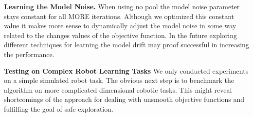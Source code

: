 \textbf{Learning the Model Noise.}
When using no pool the model noise
parameter stays constant for all MORE
iterations. Although we optimized this constant value it makes more sense to
dynamically adjust the model
noise in some way related to the changes values of the objective function.
In the future exploring different techniques for learning the model drift
may proof successful in increasing the performance.

\textbf{Testing on Complex Robot Learning Tasks}
We only conducted experiments on a simple simulated robot
task. The obvious next step is to benchmark the algorithm on more
complicated dimensional robotic tasks.
This might reveal shortcomings of the approach
for dealing with unsmooth objective functions and fulfilling the goal
of safe exploration.
